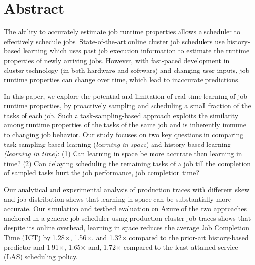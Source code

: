 \section*{Abstract}
The ability to accurately estimate job runtime properties allows a
scheduler to effectively schedule jobs.
State-of-the-art online cluster job schedulers use history-based
learning which uses past job
execution information to estimate the runtime properties of newly arriving 
jobs. However, with fast-paced development in cluster technology (in both
hardware and software) and changing user inputs, job runtime properties
can change over time, which lead to inaccurate predictions.

In this paper, we explore the potential and limitation of real-time learning of
job runtime properties, by proactively sampling and scheduling a small fraction
of the tasks of each job. Such a task-sampling-based approach exploits the
similarity among runtime properties of the tasks of the same job and is
inherently immune to changing job behavior.
Our study focuses on two key questions in comparing 
{task-sampling-based learning (\textit{learning in space})} and
history-based learning {\textit{(learning in time)}}:
(1) Can {learning in space} be more accurate than learning in time?
(2) Can {delaying scheduling} the remaining
tasks of a job till the completion of sampled tasks hurt the job performance,
\eg job completion time?

Our analytical and experimental analysis of \numTraces production traces with
different skew and job distribution shows that learning in space can be
substantially more accurate.  Our simulation and testbed evaluation on Azure of
the two approaches anchored in a generic job scheduler using \numTraces
production cluster job traces shows that despite its online overhead, learning
in space reduces the average Job Completion Time (JCT) by 1.28$\times$,
1.56$\times$, and 1.32$\times$ compared to the prior-art history-based
predictor and 1.91$\times$, 1.65$\times$ and, 1.72$\times$ compared to the
least-attained-service (LAS) scheduling policy.


